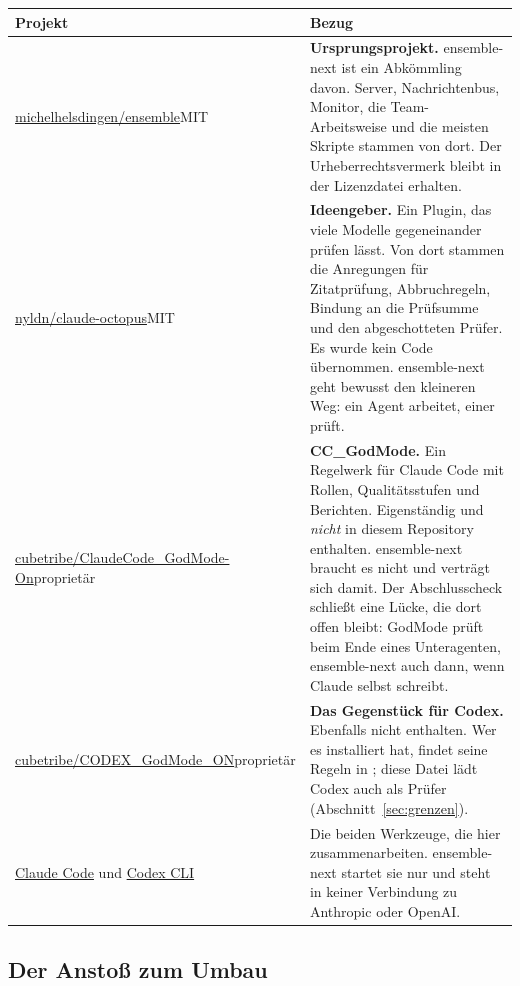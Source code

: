 \documentclass[a4paper,10pt,parskip=half-,headings=small]{scrartcl}
\newcommand{\code}[1]{\texttt{\detokenize{#1}}}
\begin{document}
\begin{tabularx}{\textwidth}{@{}L{43mm}Y@{}}
\toprule
\textbf{Projekt} & \textbf{Bezug} \\
\midrule
\href{https://github.com/michelhelsdingen/ensemble}{michelhelsdingen/ensemble}\newline MIT &
\textbf{Ursprungsprojekt.} ensemble-next ist ein Abkömmling davon. Server, Nachrichtenbus, Monitor,
die Team-Arbeitsweise und die meisten Skripte stammen von dort. Der Urheberrechtsvermerk bleibt in
der Lizenzdatei erhalten. \\
\href{https://github.com/nyldn/claude-octopus}{nyldn/claude-octopus}\newline MIT &
\textbf{Ideengeber.} Ein Plugin, das viele Modelle gegeneinander prüfen lässt. Von dort stammen die
Anregungen für Zitatprüfung, Abbruchregeln, Bindung an die Prüfsumme und den abgeschotteten Prüfer.
Es wurde kein Code übernommen. ensemble-next geht bewusst den kleineren Weg: ein Agent arbeitet,
einer prüft. \\
\href{https://github.com/cubetribe/ClaudeCode_GodMode-On}{cubetribe/\allowbreak ClaudeCode\_GodMode-On}\newline proprietär &
\textbf{CC\_GodMode.} Ein Regelwerk für Claude Code mit Rollen, Qualitätsstufen und Berichten.
Eigenständig und \emph{nicht} in diesem Repository enthalten. ensemble-next braucht es nicht und
verträgt sich damit. Der Abschlusscheck schließt eine Lücke, die dort offen bleibt: GodMode prüft
beim Ende eines Unteragenten, ensemble-next auch dann, wenn Claude selbst schreibt. \\
\href{https://github.com/cubetribe/CODEX_GodMode_ON}{cubetribe/\allowbreak CODEX\_GodMode\_ON}\newline proprietär &
\textbf{Das Gegenstück für Codex.} Ebenfalls nicht enthalten. Wer es installiert hat, findet seine
Regeln in \code{~/.codex/AGENTS.md}; diese Datei lädt Codex auch als Prüfer
(Abschnitt~\ref{sec:grenzen}). \\
\href{https://docs.anthropic.com/en/docs/claude-code}{Claude Code} und
\href{https://github.com/openai/codex}{Codex CLI} &
Die beiden Werkzeuge, die hier zusammenarbeiten. ensemble-next startet sie nur und steht in keiner
Verbindung zu Anthropic oder OpenAI. \\
\bottomrule
\end{tabularx}

\subsection{Der Anstoß zum Umbau}
\end{document}
